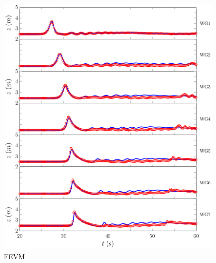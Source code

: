 \begin{figure}
	\centering
	\includegraphics[width=\textwidth]{./chp6/figures/Experiment/Roeber/Trial8/FEVM/LongWGs1.pdf}
	\caption{FEVM}
	\label{fig:Roeber8WG1to7FEVM}
\end{figure}
